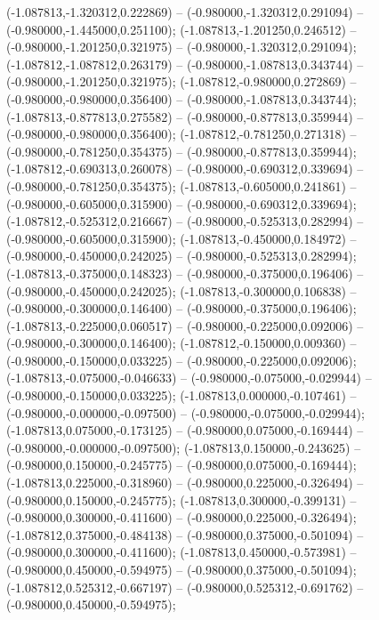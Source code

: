  (-1.087813,-1.320312,0.222869) -- (-0.980000,-1.320312,0.291094) -- (-0.980000,-1.445000,0.251100);
 (-1.087813,-1.201250,0.246512) -- (-0.980000,-1.201250,0.321975) -- (-0.980000,-1.320312,0.291094);
 (-1.087812,-1.087812,0.263179) -- (-0.980000,-1.087813,0.343744) -- (-0.980000,-1.201250,0.321975);
 (-1.087812,-0.980000,0.272869) -- (-0.980000,-0.980000,0.356400) -- (-0.980000,-1.087813,0.343744);
 (-1.087813,-0.877813,0.275582) -- (-0.980000,-0.877813,0.359944) -- (-0.980000,-0.980000,0.356400);
 (-1.087812,-0.781250,0.271318) -- (-0.980000,-0.781250,0.354375) -- (-0.980000,-0.877813,0.359944);
 (-1.087812,-0.690313,0.260078) -- (-0.980000,-0.690312,0.339694) -- (-0.980000,-0.781250,0.354375);
 (-1.087813,-0.605000,0.241861) -- (-0.980000,-0.605000,0.315900) -- (-0.980000,-0.690312,0.339694);
 (-1.087812,-0.525312,0.216667) -- (-0.980000,-0.525313,0.282994) -- (-0.980000,-0.605000,0.315900);
 (-1.087813,-0.450000,0.184972) -- (-0.980000,-0.450000,0.242025) -- (-0.980000,-0.525313,0.282994);
 (-1.087813,-0.375000,0.148323) -- (-0.980000,-0.375000,0.196406) -- (-0.980000,-0.450000,0.242025);
 (-1.087813,-0.300000,0.106838) -- (-0.980000,-0.300000,0.146400) -- (-0.980000,-0.375000,0.196406);
 (-1.087813,-0.225000,0.060517) -- (-0.980000,-0.225000,0.092006) -- (-0.980000,-0.300000,0.146400);
 (-1.087812,-0.150000,0.009360) -- (-0.980000,-0.150000,0.033225) -- (-0.980000,-0.225000,0.092006);
 (-1.087813,-0.075000,-0.046633) -- (-0.980000,-0.075000,-0.029944) -- (-0.980000,-0.150000,0.033225);
 (-1.087813,0.000000,-0.107461) -- (-0.980000,-0.000000,-0.097500) -- (-0.980000,-0.075000,-0.029944);
 (-1.087813,0.075000,-0.173125) -- (-0.980000,0.075000,-0.169444) -- (-0.980000,-0.000000,-0.097500);
 (-1.087813,0.150000,-0.243625) -- (-0.980000,0.150000,-0.245775) -- (-0.980000,0.075000,-0.169444);
 (-1.087813,0.225000,-0.318960) -- (-0.980000,0.225000,-0.326494) -- (-0.980000,0.150000,-0.245775);
 (-1.087813,0.300000,-0.399131) -- (-0.980000,0.300000,-0.411600) -- (-0.980000,0.225000,-0.326494);
 (-1.087812,0.375000,-0.484138) -- (-0.980000,0.375000,-0.501094) -- (-0.980000,0.300000,-0.411600);
 (-1.087813,0.450000,-0.573981) -- (-0.980000,0.450000,-0.594975) -- (-0.980000,0.375000,-0.501094);
 (-1.087812,0.525312,-0.667197) -- (-0.980000,0.525312,-0.691762) -- (-0.980000,0.450000,-0.594975);
